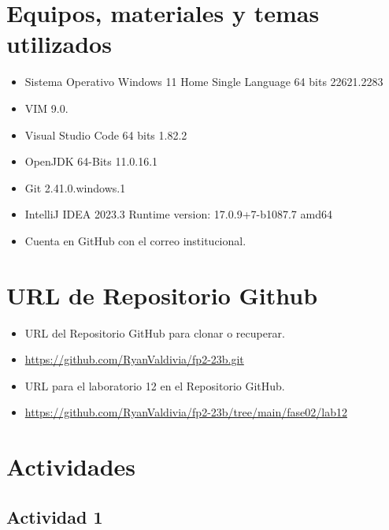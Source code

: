 \documentclass{article}
\begin{document}
	\section{Equipos, materiales y temas utilizados}
	\begin{itemize}
		\item Sistema Operativo Windows 11 Home Single Language 64 bits 22621.2283
		\item VIM 9.0.
		\item Visual Studio Code 64 bits 1.82.2
		\item OpenJDK 64-Bits 11.0.16.1
		\item Git 2.41.0.windows.1
		\item IntelliJ IDEA 2023.3 Runtime version: 17.0.9+7-b1087.7 amd64
		\item Cuenta en GitHub con el correo institucional. 
	\end{itemize}
	
	\section{URL de Repositorio Github}
	\begin{itemize}
		\item URL del Repositorio GitHub para clonar o recuperar.
		\item \url{https://github.com/RyanValdivia/fp2-23b.git}
		\item URL para el laboratorio 12 en el Repositorio GitHub.
		\item \url{https://github.com/RyanValdivia/fp2-23b/tree/main/fase02/lab12}
	\end{itemize}
	
	\section{Actividades}
	\subsection{Actividad 1}
	
\end{document}
